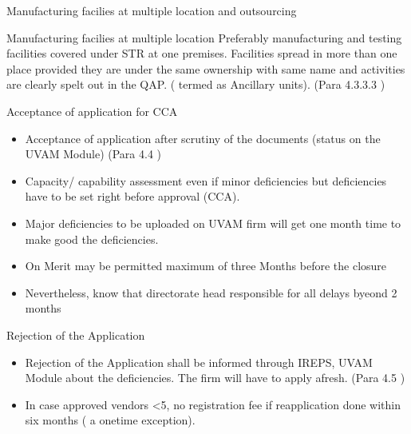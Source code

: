\documentclass[
  10pt,
  ignorenonframetext,
  aspectratio=43,
]{beamer}
\providecommand{\tightlist}{%
  \setlength{\itemsep}{0pt}\setlength{\parskip}{0pt}}
\begin{document}
\begin{frame}{Manufacturing facilies at multiple location and
outsourcing}
\protect\hypertarget{manufacturing-facilies-at-multiple-location-and-outsourcing}{}
\begin{block}{Manufacturing facilies at multiple location}
\protect\hypertarget{manufacturing-facilies-at-multiple-location}{}
Preferably manufacturing and testing facilities covered under STR at one
premises. Facilities spread in more than one place provided they are
under the same ownership with same name and activities are clearly spelt
out in the QAP. ( termed as Ancillary units). (Para 4.3.3.3 )
\end{block}
\end{frame}

\begin{frame}{Acceptance of application for CCA}
\protect\hypertarget{acceptance-of-application-for-cca}{}
\begin{itemize}
\tightlist
\item
  Acceptance of application after scrutiny of the documents (status on
  the UVAM Module) (Para 4.4 )
\item
  Capacity/ capability assessment even if minor deficiencies but
  deficiencies have to be set right before approval (CCA).
\item
  Major deficiencies to be uploaded on UVAM firm will get one month time
  to make good the deficiencies.
\item
  On Merit may be permitted maximum of three Months before the closure
\item
  Nevertheless, know that directorate head responsible for all delays
  byeond 2 months
\end{itemize}
\end{frame}

\begin{frame}{Rejection of the Application}
\protect\hypertarget{rejection-of-the-application}{}
\begin{itemize}
\item
  Rejection of the Application shall be informed through IREPS, UVAM
  Module about the deficiencies. The firm will have to apply afresh.
  (Para 4.5 )
\item
  In case approved vendors \textless5, no registration fee if
  reapplication done within six months ( a onetime exception).
\end{itemize}
\end{frame}
\end{document}
